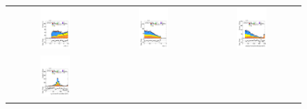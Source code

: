 \begin{figure}[htbp]
    \begin{tabular}{@{}c c c@{}}
      \includegraphics[width=0.33\textwidth]{images/modelling_tmva_vars/plot_ditau_dr_hh_tth.pdf} &
      \includegraphics[width=0.33\textwidth]{images/modelling_tmva_vars/plot_ditau_deta_hh_tth.pdf} &
      \includegraphics[width=0.33\textwidth]{images/modelling_tmva_vars/plot_met_reco_et_hh_tth.pdf} \\[4pt]
      \includegraphics[width=0.33\textwidth]{images/modelling_tmva_vars/plot_mWbest_hh_tth.pdf} &

\end{tabular}
\end{figure}
